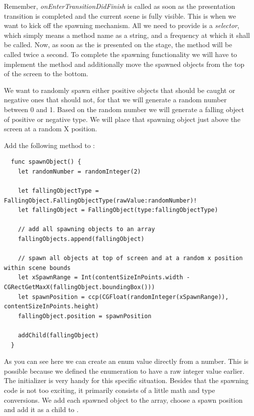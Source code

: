 Remember, \textit{onEnterTransitionDidFinish} is called as soon as the
presentation transition is completed and the current scene is fully visible.
This is when we want to kick off the spawning mechanism. 
All we need to provide is a \textit{selector}, which simply means a method name
as a string, and a frequency at which it shall be called. Now, as soon as the
 is presented on the stage, the 
method will be called twice a second.
To complete the spawning functionality we will have to implement the
 method and additionally move the spawned objects from
the top of the screen to the bottom.

We want to randomly spawn either positive objects that should be caught or
negative ones that should not, for that we will generate a random number
between 0 and 1. Based on the random number we will generate a falling object
of positive or negative type. We will place that spawning object just above the
screen at a random X position.

\begin{leftbar}
Add the following  method to :
\begin{lstlisting}
  func spawnObject() {
    let randomNumber = randomInteger(2)
    
    let fallingObjectType = FallingObject.FallingObjectType(rawValue:randomNumber)!
    let fallingObject = FallingObject(type:fallingObjectType)
    
    // add all spawning objects to an array
    fallingObjects.append(fallingObject)
    
    // spawn all objects at top of screen and at a random x position within scene bounds
    let xSpawnRange = Int(contentSizeInPoints.width - CGRectGetMaxX(fallingObject.boundingBox()))
    let spawnPosition = ccp(CGFloat(randomInteger(xSpawnRange)), contentSizeInPoints.height)
    fallingObject.position = spawnPosition
    
    addChild(fallingObject)
  }
\end{lstlisting}
\end{leftbar}

As you can see here we can create an enum value directly from a number.
This is possible because we defined the 
enumeration to have a raw integer value earlier. The 
initializer is very handy for this specific situation. Besides that the spawning
code is not too exciting, it primarily consists of a little math and type
conversions. We add each spawned object to the  array,
choose a spawn position and add it as a child to .

